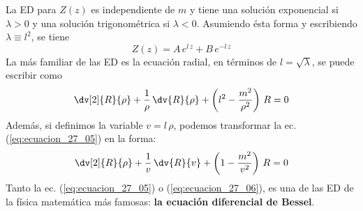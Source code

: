 \par
La ED para $Z(z)$ es independiente de $m$ y tiene una solución exponencial si $\lambda > 0$ y una solución trigonométrica si $\lambda < 0$. Asumiendo ésta forma y escribiendo $\lambda \equiv l^{2}$, se tiene
\begin{equation}
Z(z) = A \, e^{l \, z} + B \, e^{- l \, z}
\label{eq:ecuacion_27_04}
\end{equation}
La más familiar de las ED es la ecuación radial, en términos de $l = \sqrt{\lambda}$, se puede escribir como
\begin{equation}
\dv[2]{R}{\rho} + \dfrac{1}{\rho} \, \dv{R}{\rho} + \left( l^{2} - \dfrac{m^{2}}{\rho^{2}} \right) \, R = 0
\label{eq:ecuacion_27_05}
\end{equation}
Además, si definimos la variable $v = l\, \rho$, podemos transformar la ec. (\ref{eq:ecuacion_27_05}) en la forma:
\begin{equation}
\dv[2]{R}{\rho} + \dfrac{1}{v} \, \dv{R}{v} + \left( 1 - \dfrac{m^{2}}{v^{2}} \right) \, R = 0
\label{eq:ecuacion_27_06}
\end{equation}
Tanto la ec. (\ref{eq:ecuacion_27_05}) o (\ref{eq:ecuacion_27_06}), es una de las ED de la física matemática más famosas: \textbf{la ecuación diferencial de Bessel}.
